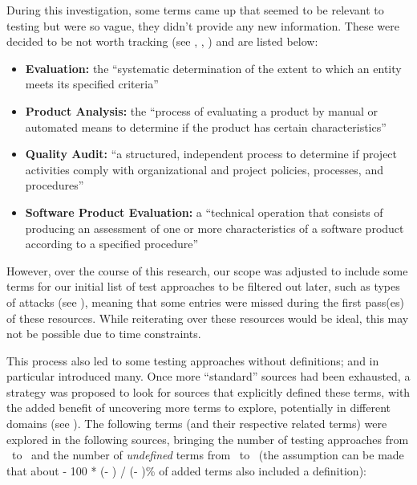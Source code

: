 During this investigation, some terms came up that seemed to be relevant to
testing but were so vague, they didn't provide any new information. These were
decided to be not worth tracking (see , ,
) and are listed below:

\begin{itemize}
      \item \textbf{Evaluation:} the ``systematic determination of the extent
            to which an entity meets its specified criteria''
            \citep[p.~167]{IEEE2017}
      \item \textbf{Product Analysis:} the ``process of evaluating a product by
            manual or automated means to determine if the product has certain
            characteristics'' \citep[p.~343]{IEEE2017}
      \item \textbf{Quality Audit:} ``a structured, independent process to
            determine if project activities comply with organizational and
            project policies, processes, and procedures'' \citep[p.~361]{IEEE2017}
      \item \textbf{Software Product Evaluation:} a ``technical operation that
            consists of producing an assessment of one or more characteristics
            of a software product according to a specified procedure''
            \citep[p.~424]{IEEE2017}
\end{itemize}

However, over the course of this research, our scope was adjusted to include
some terms for our initial list of test approaches to be filtered out later,
such as types of attacks (see ), meaning that some entries
were missed during the first pass(es) of these resources. While reiterating
over these resources would be ideal, this may not be possible due to time
constraints.


\newcount\TotalBefore
\newcount\TotalAfter
\newcount\UndefBefore
\newcount\UndefAfter



This process also led to some testing approaches without definitions;
\citep{IEEE2022} and \citep{Firesmith2015} in particular introduced many.
Once more ``standard'' sources had been exhausted, a strategy was proposed to
look for sources that explicitly defined these terms, with the added benefit of
uncovering more terms to explore, potentially in different domains (see
). The following terms (and their respective related terms)
were explored in the following sources, bringing the number of testing
approaches from \the\TotalBefore~to \the\TotalAfter~and the number of
\emph{undefined} terms from \the\UndefBefore~to \the\UndefAfter~(the assumption
can be made that about \the{} - 100 * (\UndefAfter - \UndefBefore) /
(\TotalAfter - \TotalBefore)\relax\% of added terms also included a definition):

